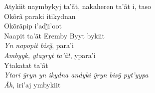 \begin{linenumbers}\begingroup\raggedright

\noindent   Atykiit naymbykyj ta'ãt, nakaheren ta'ãt i, taso\\
  Okõrã paraki itikydnan\\
  Okõrãpip i’adj̃i’oot \\
  Naapit ta'ãt Eremby Byyt bykiit\\
  \emph{Yn napopit bisỹ}, para’i\\
  \emph{Ambyyk, ytayryt ta'ãt}, ypara'i\\
  Ytakatat ta'ãt\\
  \emph{Ytari ỹryn yn ikydna andyki ỹryn bisỹ pyt’yypa}\\
  \emph{Ãh}, iri'aj ymbykiit

\end{linenumbers}\endgroup

\bigskip

